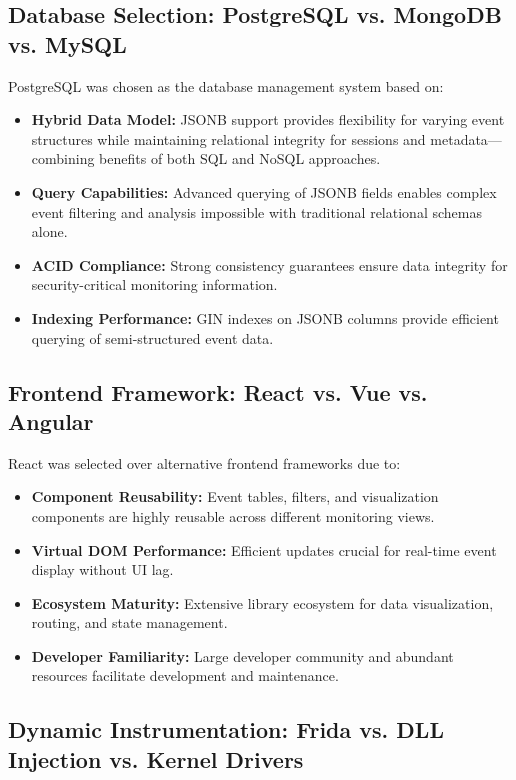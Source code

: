 \subsection{Database Selection: PostgreSQL vs. MongoDB vs. MySQL}

PostgreSQL was chosen as the database management system based on:

\begin{itemize}
    \item \textbf{Hybrid Data Model:} JSONB support provides flexibility for varying event structures while maintaining relational integrity for sessions and metadata—combining benefits of both SQL and NoSQL approaches.
    \item \textbf{Query Capabilities:} Advanced querying of JSONB fields enables complex event filtering and analysis impossible with traditional relational schemas alone.
    \item \textbf{ACID Compliance:} Strong consistency guarantees ensure data integrity for security-critical monitoring information.
    \item \textbf{Indexing Performance:} GIN indexes on JSONB columns provide efficient querying of semi-structured event data.
\end{itemize}

\subsection{Frontend Framework: React vs. Vue vs. Angular}

React was selected over alternative frontend frameworks due to:

\begin{itemize}
    \item \textbf{Component Reusability:} Event tables, filters, and visualization components are highly reusable across different monitoring views.
    \item \textbf{Virtual DOM Performance:} Efficient updates crucial for real-time event display without UI lag.
    \item \textbf{Ecosystem Maturity:} Extensive library ecosystem for data visualization, routing, and state management.
    \item \textbf{Developer Familiarity:} Large developer community and abundant resources facilitate development and maintenance.
\end{itemize}

\subsection{Dynamic Instrumentation: Frida vs. DLL Injection vs. Kernel Drivers}

